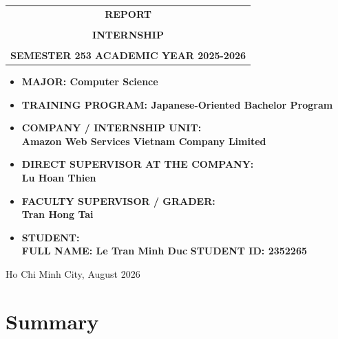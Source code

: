 \documentclass[a4paper]{article}
\begin{document}
\begin{titlepage}
\begin{center}
\begin{tabular}{c}
\multicolumn{1}{c}{\textbf{{\LARGE REPORT}}}\\
\\{\textbf{{\LARGE INTERNSHIP}}}
\\
\\
\textbf{\Large SEMESTER 253 ACADEMIC YEAR 2025-2026} \\
\end{tabular}
\end{center}
\vspace{0.5cm}
\begin{itemize}
\renewcommand\labelitemi{--}
    \item \Large \textbf{MAJOR: Computer Science}
    \item \Large \textbf{TRAINING PROGRAM: Japanese-Oriented Bachelor Program}
\end{itemize}
\vspace{0.7cm}
\begin{itemize}
\renewcommand\labelitemi{--}
    \item \Large \textbf{COMPANY / INTERNSHIP UNIT:}
    \\ \Large \textbf{Amazon Web Services Vietnam Company Limited}
    \item \Large \textbf{DIRECT SUPERVISOR AT THE COMPANY:}
    \\ \Large \textbf{Lu Hoan Thien}
    \item \Large \textbf{FACULTY SUPERVISOR / GRADER:}
    \\ \Large \textbf{Tran Hong Tai}
    \item \Large \textbf{STUDENT:}
    \\ \Large \textbf{FULL NAME: Le Tran Minh Duc} \textbf{STUDENT ID: 2352265}
\end{itemize}
\vspace{0.5cm}
\begin{center}
{\Large Ho Chi Minh City, August 2026}
\end{center}
\end{titlepage}

\newpage
\tableofcontents
\newpage





\newpage
\section{Summary}
\end{document}
